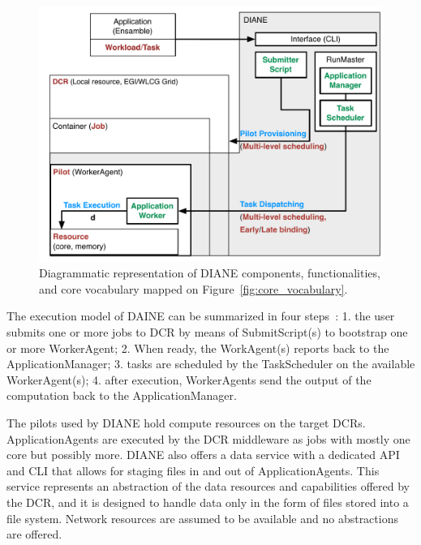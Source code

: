 \documentclass{sig-alternate}
\begin{document}
\begin{figure}[t]
    \centering
        \includegraphics[width=.48\textwidth]{figures/diane_comparison.pdf}
    \caption{Diagrammatic representation of DIANE components,
    functionalities, and core vocabulary mapped on
    Figure~\ref{fig:core_vocabulary}.}
    \label{fig:diane_comparison}
\end{figure}

The execution model of DAINE can be summarized in four
steps~\cite{moscicki2011understanding}: 1. the user submits one or more jobs to
DCR by means of SubmitScript(s) to bootstrap one or more WorkerAgent; 2. When
ready, the WorkAgent(s) reports back to the ApplicationManager; 3. tasks are
scheduled by the TaskScheduler on the available WorkerAgent(s); 4. after
execution, WorkerAgents send the output of the computation back to the
ApplicationManager.

 


The pilots used by DIANE hold compute resources on the target DCRs.
ApplicationAgents are executed by the DCR middleware as jobs with mostly one
core but possibly more. DIANE also offers a data service with a dedicated API
and CLI that allows for staging files in and out of ApplicationAgents. This
service represents an abstraction of the data resources and capabilities offered
by the DCR, and it is designed to handle data only in the form of files stored
into a file system. Network resources are assumed to be available and no
abstractions are offered.      
\end{document}

